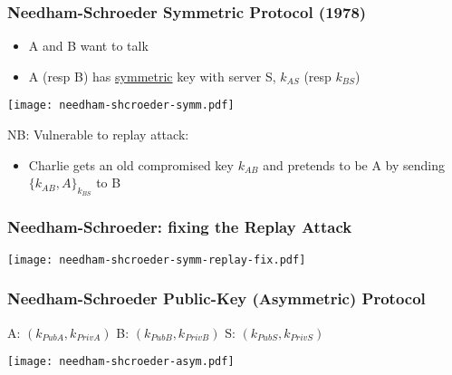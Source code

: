 \documentclass[
hyperref={pdfpagelabels=false}
,xcolor=table
]
{beamer}
\begin{document}
\begin{frame}
  \frametitle{Needham-Schroeder Symmetric Protocol (1978)}

  \begin{itemize}
  \item A and B want to talk
  \item A (resp B) has \underline{symmetric} key with server S, $k_{AS}$ (resp $k_{BS}$)
  \end{itemize}

  
  \begin{center}
    \texttt{[image: needham-shcroeder-symm.pdf]}
  \end{center}

  NB: Vulnerable to replay attack: 
  \begin{itemize}
  \item Charlie gets an old compromised key $k_{AB}$ and pretends to be A by sending $\{k_{AB}, A\}_{k_{BS}}$ to B
  \end{itemize}
\end{frame}



\begin{frame}
  \frametitle{Needham-Schroeder: fixing the Replay Attack}

  \begin{center}
    \texttt{[image: needham-shcroeder-symm-replay-fix.pdf]}
  \end{center}
\end{frame}



\begin{frame}
  \frametitle{Needham-Schroeder Public-Key (Asymmetric) Protocol}

  A: $(k_{PubA}, k_{PrivA})$    B: $(k_{PubB}, k_{PrivB})$      S: $(k_{PubS}, k_{PrivS})$  


  \begin{center}
    \texttt{[image: needham-shcroeder-asym.pdf]}
  \end{center}  
  
\end{frame}
\end{document}
